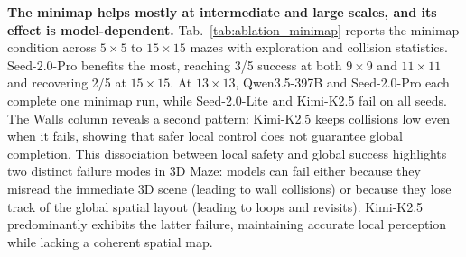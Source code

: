 \documentclass{llmxive}
\begin{document}


\noindent\textbf{The minimap helps mostly at intermediate and large scales, and its effect is model-dependent.}
Tab.~\ref{tab:ablation_minimap} reports the minimap condition across $5{\times}5$ to $15{\times}15$ mazes with exploration and collision statistics. Seed-2.0-Pro benefits the most, reaching 3/5 success at both $9{\times}9$ and $11{\times}11$ and recovering 2/5 at $15{\times}15$. At $13{\times}13$, Qwen3.5-397B and Seed-2.0-Pro each complete one minimap run, while Seed-2.0-Lite and Kimi-K2.5 fail on all seeds. The Walls column reveals a second pattern: Kimi-K2.5 keeps collisions low even when it fails, showing that safer local control does not guarantee global completion. This dissociation between local safety and global success highlights two distinct failure modes in 3D Maze: models can fail either because they misread the immediate 3D scene (leading to wall collisions) or because they lose track of the global spatial layout (leading to loops and revisits). Kimi-K2.5 predominantly exhibits the latter failure, maintaining accurate local perception while lacking a coherent spatial map.
\end{document}
